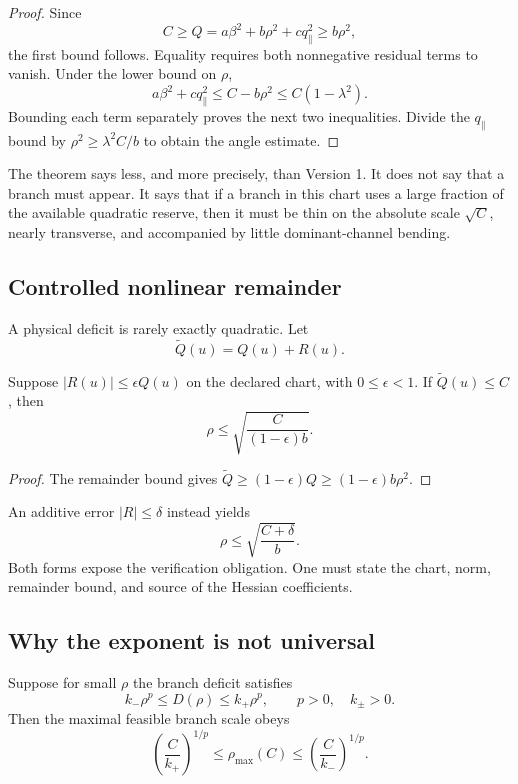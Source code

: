 \documentclass[11pt]{article}
\begin{document}
\begin{proof}
Since
\[
  C\geq Q
  =a\beta^2+b\rho^2+cq_\parallel^2
  \geq b\rho^2,
\]
the first bound follows.  Equality requires both nonnegative residual terms
to vanish.  Under the lower bound on $\rho$,
\[
  a\beta^2+cq_\parallel^2
  \leq C-b\rho^2
  \leq C(1-\lambda^2).
\]
Bounding each term separately proves the next two inequalities.  Divide the
$q_\parallel$ bound by
$\rho^2\geq\lambda^2C/b$ to obtain the angle estimate.
\end{proof}

The theorem says less, and more precisely, than Version 1.  It does not say
that a branch must appear.  It says that if a branch in this chart uses a
large fraction of the available quadratic reserve, then it must be thin on
the absolute scale $\sqrt C$, nearly transverse, and accompanied by little
dominant-channel bending.

\subsection{Controlled nonlinear remainder}

A physical deficit is rarely exactly quadratic.  Let
\[
  \widetilde Q(u)=Q(u)+R(u).
\]

\begin{theorem}
Suppose $|R(u)|\leq\epsilon Q(u)$ on the declared chart, with
$0\leq\epsilon<1$.  If $\widetilde Q(u)\leq C$, then
\[
  \rho
  \leq
  \sqrt{\frac{C}{(1-\epsilon)b}}.
\]
\end{theorem}

\begin{proof}
The remainder bound gives
$\widetilde Q\geq(1-\epsilon)Q\geq(1-\epsilon)b\rho^2$.
\end{proof}

An additive error $|R|\leq\delta$ instead yields
\[
  \rho\leq\sqrt{\frac{C+\delta}{b}}.
\]
Both forms expose the verification obligation.  One must state the chart,
norm, remainder bound, and source of the Hessian coefficients.

\subsection{Why the exponent is not universal}

\begin{proposition}
Suppose for small $\rho$ the branch deficit satisfies
\[
  k_-\rho^p\leq D(\rho)\leq k_+\rho^p,
  \qquad p>0,\quad k_\pm>0.
\]
Then the maximal feasible branch scale obeys
\[
  \left(\frac{C}{k_+}\right)^{1/p}
  \leq \rho_{\max}(C)
  \leq
  \left(\frac{C}{k_-}\right)^{1/p}.
\]
\end{proposition}
\end{document}
